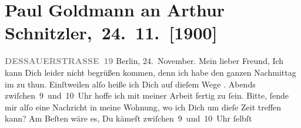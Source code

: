 

         
         \renewcommand{\erwaehntePersonen}{Personen: Moritz Coschell, Marie Glümer, Alfred Kerr, Paul Martin Marton}
         \renewcommand{\erwaehnteOrte}{Orte: Berlin, Dessauer Straße, Hotel Kaiserhof, Reichstag}
         \renewcommand{\erwaehnteWerke}{}
               \section[ Paul Goldmann an Arthur Schnitzler, 24. 11. {[}1900{]}]{ Paul Goldmann an Arthur Schnitzler, 24. 11. {[}1900{]}}\nopagebreak{}\rehead{ }\begin{ledgroupsized}[t]{13cm}\normalsize\beginnumbering \toendnotes[C]{\smallbreak\pagebreak[2]} 
\toendnotes[C]{\smallbreak}\pstart
           \noindent{}\raggedleft{}{\pb}\textcolor{gray}{\textbf{DESSAUERSTRASSE 19}}\pend
           \pstart
           Berlin, 24. November.\pend
           \pstart\center{}Mein lieber Freund,\pend\pstart
           Ich kann Dich leider nicht begrüßen kommen, denn ich habe den ganzen Nachmittag im
                  \label{K_L02940-1v}\label{K_L02940-1h} zu thun. Einſtweilen alſo heiße ich Dich auf dieſem Wege \label{K_L02940-2v}\label{K_L02940-2h}. Abends
                  zwiſchen 9 und 10 Uhr hoffe ich mit meiner Arbeit fertig zu ſein. Bitte,
               ſende mir alſo eine Nachricht in meine Wohnung, wo ich Dich um dieſe Zeit treffen {\pb}kann? Am Beſten wäre es, Du kämeſt
                  zwiſchen 9 und 10 Uhr ſelbſt \label{K_L02940-3v}
\end{ledgroupsized}
